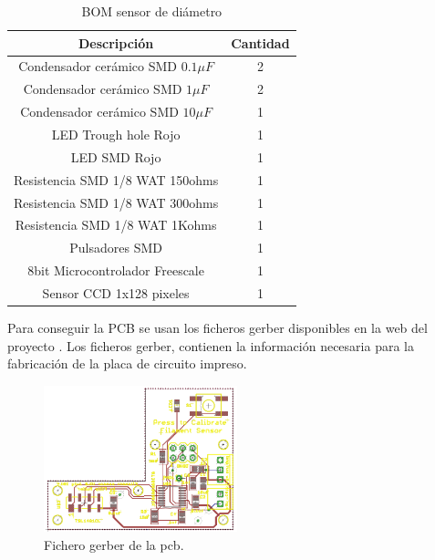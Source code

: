 \begin{table}[H]
    \centering
    \begin{tabular}{cc}
        {\bf Descripción}                 & {\bf Cantidad} \\ \hline
        Condensador cerámico SMD $0.1 \mu F$ & 2              \\
        Condensador cerámico SMD $1 \mu F$   & 2              \\
        Condensador cerámico SMD $10 \mu F$  & 1              \\
        LED Trough hole Rojo             & 1              \\
        LED SMD Rojo                     & 1              \\
        Resistencia SMD 1/8 WAT 150ohms  & 1              \\
        Resistencia SMD 1/8 WAT 300ohms  & 1              \\
        Resistencia SMD 1/8 WAT 1Kohms   & 1              \\
        Pulsadores SMD                   & 1              \\
        8bit Microcontrolador Freescale  & 1              \\
        Sensor CCD 1x128 pixeles         & 1             
    \end{tabular}
    \caption{BOM sensor de diámetro}
    \label{tab:BOM}
\end{table}

Para conseguir la PCB se usan los ficheros gerber disponibles en la web del proyecto \cite{thing_filamento}. Los ficheros gerber, contienen la información necesaria para la fabricación de la placa de circuito impreso.

\begin{figure}[H]
    \centering
    \includegraphics[width=0.5\textwidth]{images/sensor/gerber.png}
    \caption{Fichero gerber de la pcb.}
    \label{fig:sens_gerber}
\end{figure}


